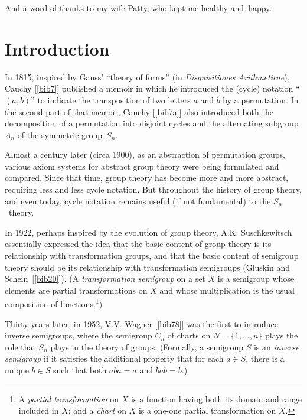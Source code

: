 \documentclass{surv-l}
\numberwithin{equation}{section}
\numberwithin{table}{section}
\numberwithin{figure}{section}
\theoremstyle{plain}
\theoremstyle{definition}
\begin{document}
And a word of thanks to my wife Patty, who kept me healthy
and~happy.


\chapter*{Introduction}

In 1815, inspired by Gauss' ``theory of forms'' (in
\emph{Disquisitiones Arithmeticae}), Cauchy
[\ref{bib7}] published a memoir in which he
introduced the (cycle) notation ``$(a,b)$'' to indicate the
transposition of two letters $a$ and $b$ by a permutation. In the
second part of that memoir, Cauchy [\ref{bib7a}]
also introduced both the decomposition of a permutation into
disjoint cycles and the alternating subgroup $A_{n}$ of the symmetric
group~$S_{n}$.

Almost a century later (circa 1900), as an abstraction of
permutation groups, various axiom systems for abstract group
theory were being formulated and compared. Since that time, group
theory has become more and more abstract, requiring less and less
cycle notation. But throughout the history of group theory, and
even today, cycle notation remains useful (if not fundamental) to
the $S_{n}$~theory.

\setcounter{footnote}{0}

In 1922, perhaps inspired by the evolution of group theory, A.K.
Suschkewitsch essentially expressed the idea that the basic
content of group theory is its relationship with transformation
groups, and that the basic content of semigroup theory should be
its relationship with transformation
semigroups
(Gluskin and Schein~[\ref{bib20}]). (A \emph{transformation
semigroup} on a set $X$ is a semigroup whose
elements are partial transformations on $X$ and whose
multiplication is the usual composition of functions.\footnote{A
\emph{partial transformation} on $X$
is a function having both its domain and range included in $X$;
and a \emph{chart} on $X$ is a one-one partial
transformation on $X$.})

Thirty years later, in 1952, V.V. Wagner
[\ref{bib78}] was the first to introduce inverse
semigroups, where the semigroup $C_{n}$ of charts on
$N=\{1,\ldots, n\}$ plays the role that $S_{n}$ plays in the
theory of groups. (Formally, a semigroup $S$ is an \emph{inverse
semigroup} if it satisfies the additional
property that for each $a\in S$, there is a unique $b\in S$ such
that both $aba=a$ and $bab=b.$)
\end{document}
